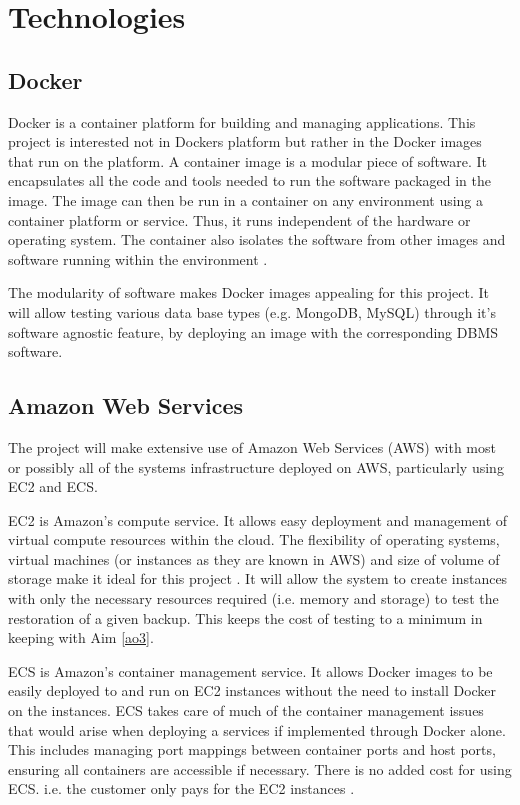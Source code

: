 
\section{Technologies}

\subsection{Docker}
Docker is a container platform for building and managing applications. This project is interested not in Dockers platform but rather in the Docker images that run on the platform. A container image is a modular piece of software. It encapsulates all the code and tools needed to run the software packaged in the image. The image can then be run in a container on any environment using a container platform or service. Thus, it runs independent of the hardware or operating system. The container also isolates the software from other images and software running within the environment \citep{docker}.

The modularity of software makes Docker images appealing for this project. It will allow testing various data base types (e.g. MongoDB, MySQL) through it's software agnostic feature, by deploying an image with the corresponding DBMS software.

\subsection{Amazon Web Services}
The project will make extensive use of Amazon Web Services (AWS) with most or possibly all of the systems infrastructure deployed on AWS, particularly using EC2 and ECS.

EC2 is Amazon's compute service. It allows easy deployment and management of virtual compute resources within the cloud. The flexibility of operating systems, virtual machines (or instances as they are known in AWS) and size of volume of storage make it ideal for this project \citep{ec2}. It will allow the system to create instances with only the necessary resources required (i.e. memory and storage) to test the restoration of a given backup. This keeps the cost of testing to a minimum in keeping with Aim \ref{ao3}.

ECS is Amazon's container management service. It allows Docker images to be easily deployed to and run on  EC2 instances without the need to install Docker on the instances. ECS takes care of much of the container management issues that would arise when deploying a services if implemented through Docker alone. This includes managing port mappings between container ports and host ports, ensuring all containers are accessible if necessary. There is no added cost for using ECS. i.e. the customer only pays for the EC2 instances \citep{ecs}. 

